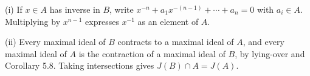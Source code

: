 (i) If $x\in A$ has inverse in $B$, write $x^{-n}+a_1x^{-(n-1)}+\cdots+a_n=0$ with $a_i\in A$. Multiplying by $x^{n-1}$ expresses $x^{-1}$ as an element of $A$.

(ii) Every maximal ideal of $B$ contracts to a maximal ideal of $A$, and every maximal ideal of $A$ is the contraction of a maximal ideal of $B$, by lying-over and Corollary 5.8. Taking intersections gives $J(B)\cap A=J(A)$.
